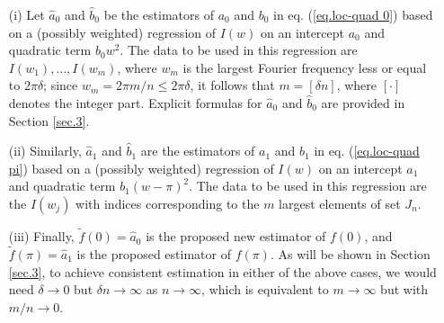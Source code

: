 \documentclass[12p E.Lt,psfig]{article} %
\begin{document}
\begin{enumerate}
\item [(i)]
Let $\hat a_0$ and $\hat b_0$
be  the estimators of  $a_0$ and $b_0$  in eq. (\ref{eq.loc-quad 0}) based on  a
(possibly weighted)   regression of $I(w )$ on
  an intercept  $a_0$ and quadratic term $b_0w^2$. The data to be used in this regression
are $I(w_1), \ldots, I(w_m) $, where $w_m$ is the largest Fourier frequency less or equal to $2  \pi \delta$;
since $w_m=2\pi m/n \leq 2  \pi \delta$, it follows that $m=[\delta n ]$, where $[\cdot]$
denotes the integer part. Explicit 
formulas for $\hat{a}_0$ and $\hat{b}_0$ are provided in Section \ref{sec.3}.


\item [(ii)]
Similarly,  $\hat a_1$ and $\hat b_1$
are  the estimators of  $a_1$ and $b_1$  in eq. (\ref{eq.loc-quad pi}) based on a
(possibly weighted)   regression of $I(w )$ on
  an intercept  $a_1$ and quadratic term $b_1(w-\pi) ^2$. The data to be used in this regression
are the $I(w_j)  $  with indices corresponding to the $m$ largest elements of set $J_n$.

\item [(iii)] Finally,  $\tilde f(0)=\hat a_0$  is  the proposed new  estimator of $  f(0)$,
and  $\tilde f(\pi) =\hat a_1$ is  the proposed  estimator of $  f(\pi)$.
As will be shown in Section \ref{sec.3}, to achieve consistent estimation
in either of the above cases,
 we would need $\delta \to 0$ but $\delta n\to \infty $ as $n\to \infty $, which is equivalent to
$m\to \infty $ but with $m/n \to 0$.
\end{enumerate}
 
\end{document}
